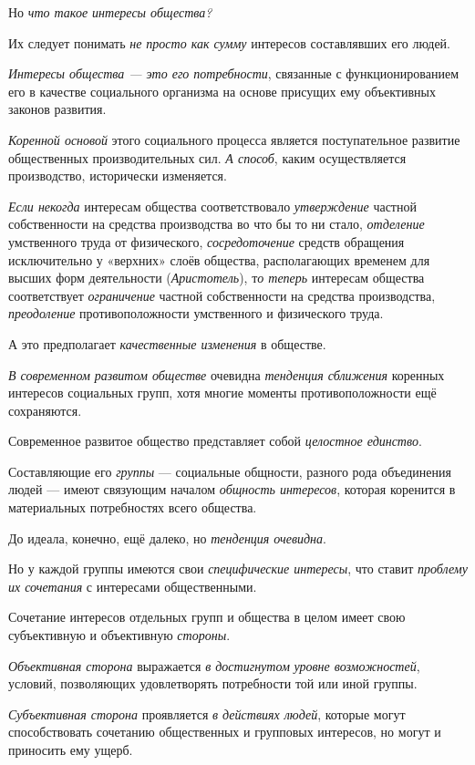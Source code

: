 \documentclass[a4paper,14pt,russian]{extreport}
\begin{document}
Но \emph{что такое интересы общества?}

Их следует понимать \emph{не просто как сумму} интересов составлявших его людей.

\emph{Интересы общества --- это его потребности}, связанные с функционированием его в качестве социального организма на основе присущих ему объективных законов развития.

\emph{Коренной основой} этого социального процесса является поступательное развитие общественных производительных сил. \emph{А способ}, каким осуществляется производство, исторически изменяется.

\emph{Если некогда} интересам общества соответствовало \emph{утверждение} частной собственности на средства производства во что бы то ни стало, \emph{отделение} умственного труда от физического, \emph{сосредоточение} средств обращения исключительно у «верхних» слоёв общества, располагающих временем для высших форм деятельности (\emph{Аристотель}), т\emph{о теперь} интересам общества соответствует \emph{ограничение} частной собственности на средства производства, \emph{преодоление} противоположности умственного и физического труда.

А это предполагает \emph{качественные изменения} в обществе.

\emph{В современном развитом обществе} очевидна \emph{тенденция сближения} коренных интересов социальных групп, хотя многие моменты противоположности ещё сохраняются.

Современное развитое общество представляет собой \emph{целостное единство}.

Составляющие его \emph{группы} --- социальные общности, разного рода объединения людей --- имеют связующим началом \emph{общность интересов}, которая коренится в материальных потребностях всего общества.

До идеала, конечно, ещё далеко, но \emph{тенденция очевидна}.

Но у каждой группы имеются свои \emph{специфические интересы}, что ставит \emph{проблему их сочетания} с интересами общественными.

Сочетание интересов отдельных групп и общества в целом имеет свою субъективную и объективную \emph{стороны}.

\emph{Объективная сторона} выражается \emph{в достигнутом} \emph{уровне возможностей}, условий, позволяющих удовлетворять потребности той или иной группы.

\emph{Субъективная сторона} проявляется \emph{в действиях людей}, которые могут способствовать сочетанию общественных и групповых интересов, но могут и приносить ему ущерб.
\end{document}
